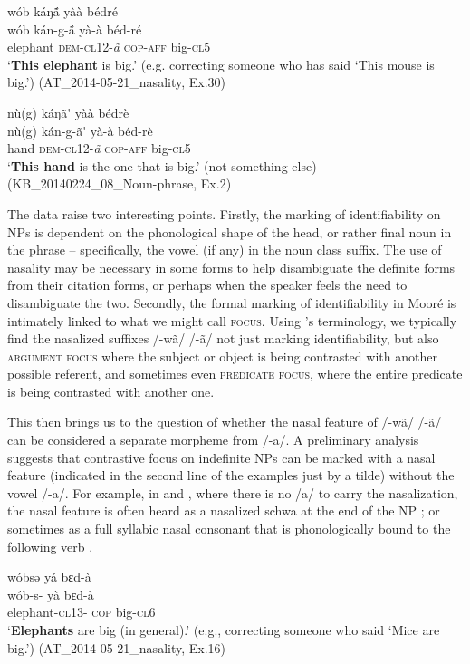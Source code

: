 \documentclass[output=paper]{langsci/langscibook}
\begin{document}
\ea\label{ex:teo:53}
wób káŋ\'{ã} yàà bédré\\
\gll wób kán-g-\'{ã} yà-à béd-ré\\
elephant \textsc{dem-cl12}-\textit{ã} \textsc{cop-aff} big-\textsc{cl5}\\
\glt ‘\textbf{This elephant} is big.’ (e.g. correcting someone who has said ‘This mouse is big.’) (AT\_2014-05-21\_nasality, Ex.30)
\z

\ea\label{ex:teo:54}
nù(g) káŋã\'{}  yàà bédrè\\
\gll nù(g) kán-g-ã\'{}  yà-à béd-rè\\
hand \textsc{dem-cl12}-\textit{ã} \textsc{cop-aff} big-\textsc{cl5}\\
\glt ‘\textbf{This hand} is the one that is big.’ (not something else) (KB\_20140224\_08\_Noun-phrase, Ex.2)
\z

The data raise two interesting points. Firstly, the marking of identifiability on NPs is dependent on the phonological shape of the head, or rather final noun in the phrase – specifically, the vowel (if any) in the noun class suffix. The use of nasality may be necessary in some forms to help disambiguate the definite forms from their citation forms, or perhaps when the speaker feels the need to disambiguate the two. Secondly, the formal marking of identifiability in Mooré is intimately linked to what we might call \textsc{focus}. Using \cite{Lambrecht1994}'s terminology, we typically find the nasalized suffixes /-wã/ {\Tilde} /-ã/ not just marking identifiability, but also \textsc{argument focus} where the subject or object is being contrasted with another possible referent, and sometimes even \textsc{predicate focus}, where the entire predicate is being contrasted with another one.


This then brings us to the question of whether the nasal feature of /-wã/ {\Tilde} /-ã/ can be considered a separate morpheme from /-a/. A preliminary analysis suggests that contrastive focus on indefinite NPs can be marked with a nasal feature (indicated in the second line of the examples just by a tilde) without the vowel /-a/. For example, in  and , where there is no /a/ to carry the nasalization, the nasal feature is often heard as a nasalized schwa at the end of the NP ; or sometimes as a full syllabic nasal consonant that is phonologically bound to the following verb .

\ea\label{ex:teo:55}
wóbsə yá bɛd-à\\
\gll wób-s-{\Tilde}  yà bɛd-à\\
elephant-\textsc{cl13}-{\Tilde}  \textsc{cop} big-\textsc{cl6}\\
\glt ‘\textbf{Elephants} are big (in general).’ (e.g., correcting someone who said ‘Mice are big.’) (AT\_2014-05-21\_nasality, Ex.16)
\z
\end{document}
